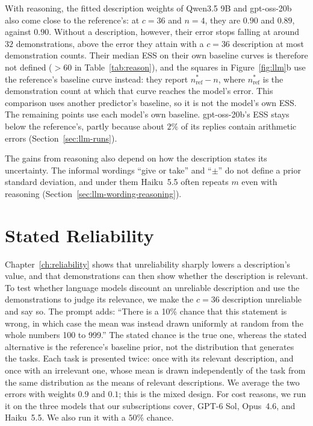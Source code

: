With reasoning, the fitted description weights of Qwen3.5 9B and gpt-oss-20b also come close to the reference's: at $c=36$ and $n=4$, they are $0.90$ and $0.89$, against $0.90$. Without a description, however, their error stops falling at around $32$ demonstrations, above the error they attain with a $c=36$ description at most demonstration counts. Their median ESS on their own baseline curves is therefore not defined ($>60$ in Table~\ref{tab:reason}), and the squares in Figure~\ref{fig:llm}b use the reference's baseline curve instead: they report $n^*_{\mathrm{ref}}-n$, where $n^*_{\mathrm{ref}}$ is the demonstration count at which that curve reaches the model's error. This comparison uses another predictor's baseline, so it is not the model's own ESS. The remaining points use each model's own baseline. gpt-oss-20b's ESS stays below the reference's, partly because about $2\%$ of its replies contain arithmetic errors (Section~\ref{sec:llm-runs}).

The gains from reasoning also depend on how the description states its uncertainty. The informal wordings ``give or take'' and ``$\pm$'' do not define a prior standard deviation, and under them Haiku~5.5 often repeats $m$ even with reasoning (Section~\ref{sec:llm-wording-reasoning}).

\section{Stated Reliability}\label{sec:llm-stated}

Chapter~\ref{ch:reliability} shows that unreliability sharply lowers a description's value, and that demonstrations can then show whether the description is relevant. To test whether language models discount an unreliable description and use the demonstrations to judge its relevance, we make the $c=36$ description unreliable and say so. The prompt adds: ``There is a 10\% chance that this statement is wrong, in which case the mean was instead drawn uniformly at random from the whole numbers 100 to 999.'' The stated chance is the true one, whereas the stated alternative is the reference's baseline prior, not the distribution that generates the tasks. Each task is presented twice: once with its relevant description, and once with an irrelevant one, whose mean is drawn independently of the task from the same distribution as the means of relevant descriptions. We average the two errors with weights $0.9$ and $0.1$; this is the mixed design. For cost reasons, we run it on the three models that our subscriptions cover, GPT-6 Sol, Opus~4.6, and Haiku~5.5. We also run it with a $50\%$ chance.

